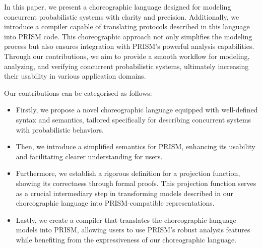 In this paper, we present a choreographic language designed for modeling concurrent probabilistic systems with clarity and precision. Additionally, we introduce a compiler capable of translating protocols described in this language into PRISM code. This choreographic approach not only simplifies the modeling process but also ensures integration with PRISM's powerful analysis capabilities. Through our contributions, we aim to provide a smooth workflow for modeling, analyzing, and verifying concurrent probabilistic systems, ultimately increasing their usability in various application domains. 

 Our contributions can be categorised as follows: 
\begin{itemize} 
\item Firstly, we propose a novel choreographic language equipped with well-defined syntax and semantics, tailored specifically for describing concurrent systems with probabilistic behaviors. 
\item Then, we introduce a simplified semantics for PRISM, enhancing its usability and facilitating clearer understanding for users.
\item Furthermore, we establish a rigorous definition for a projection function, showing its correctness through formal proofs. This projection function serves as a crucial intermediary step in transforming models described in our choreographic language into PRISM-compatible representations. 
\item Lastly, we create a compiler that translates the choreographic language models into PRISM, allowing users to use PRISM's robust analysis features while benefiting from the expressiveness of our choreographic language.
\end{itemize}



